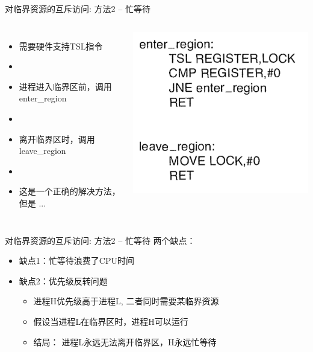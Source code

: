 \documentclass[xcolor=svgnames]{beamer}
\begin{document}
\begin{CJK*}{UTF8}{gbsn}
\begin{frame}{对临界资源的互斥访问: 方法2 -- 忙等待}
\begin{columns}%
\begin{itemize}
\item 需要硬件支持TSL指令
\item[]
\item 进程进入临界区前，调用enter\_region
\item[]
\item 离开临界区时，调用leave\_region
\item[]
\item 这是一个正确的解决方法，但是 ...
\end{itemize}
\includegraphics[width=1.0\textwidth]{tsl.png}
\end{columns}%
\end{frame}

\begin{frame}{对临界资源的互斥访问: 方法2 -- 忙等待}
两个缺点：

\begin{itemize}
\item 缺点1：忙等待浪费了CPU时间
\item 缺点2：优先级反转问题
\begin{itemize}
\item 进程H优先级高于进程L, 二者同时需要某临界资源
\item 假设当进程L在临界区时，进程H可以运行
\item 结局： 进程L永远无法离开临界区，H永远忙等待
\end{itemize}
\end{itemize}


\end{frame}
\end{CJK*}
\end{document}
